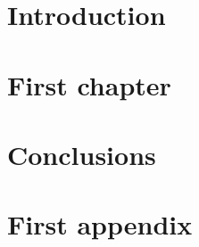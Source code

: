 \documentclass[a4paper,twoside,12pt]{book}
\begin{document}
\chapter*{Introduction\label{chap:introduction}}

\cleardoublepage{}

\chapter{First chapter\label{chap:first-chapter}}

\cleardoublepage{}

\chapter*{Conclusions}

\cleardoublepage{}



\cleardoublepage{}

\appendix
\chapter{First appendix\label{app:first-appendix}}

\cleardoublepage{}

\end{document}
